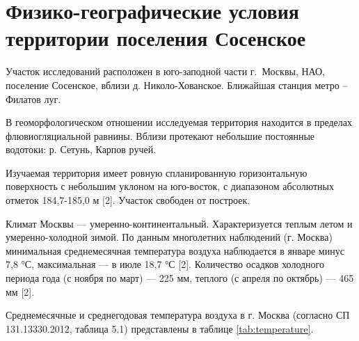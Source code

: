 \chapter{Физико-географические условия территории поселения Сосенское}\label{ch:ch1}
 
Участок исследований расположен в юго-заподной части г.~Москвы, НАО, поселение Сосенское, 
вблизи д. Николо-Хованское. Ближайшая станция метро – Филатов луг.

В геоморфологическом отношении исследуемая территория находится в пределах флювиогляциальной равнины. 
Вблизи протекают небольшие постоянные водотоки: р. Сетунь, Карпов ручей.

Изучаемая территория имеет ровную спланированную горизонтальную поверхность с небольшим уклоном на юго-восток, 
с диапазоном абсолютных отметок 184,7-185,0 м [2]. Участок свободен от построек.

Климат Москвы — умеренно-континентальный. 
Характеризуется теплым летом и умеренно-холодной зимой.
По данным многолетних наблюдений (г. Москва) минимальная среднемесячная температура воздуха наблюдается в январе минус 7,8 °С, максимальная — в июле 18,7 °С [2]. 
Количество осадков холодного периода года (с ноября по март) — 225 мм, теплого (с апреля по октябрь) — 465 мм [2]. 

Среднемесячные и среднегодовая температура воздуха в г. Москва (согласно СП 131.13330.2012, таблица 5.1) 
представлены в таблице \ref{tab:temperature}.


